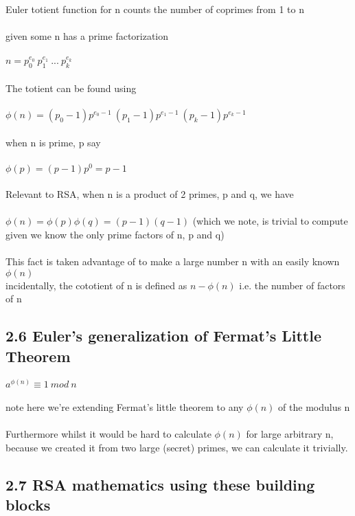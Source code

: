 \documentclass[11pt]{article}   	%
\begin{document}
Euler totient function for n counts the number of coprimes from 1 to n \\
\\
given some n has a prime factorization \\
\\
$ n = p_0^{e_0} \ p_1^{e_1} \ ... \ p_k^{e_k} $ \\
\\
The totient can be found using \\
\\
$ \phi(n) = (p_0 - 1)p^{e_0 - 1} \ (p_1 - 1)p^{e_1 - 1} \ (p_k - 1)p^{e_k - 1} $ \\
\\
when n is prime, p say \\
\\
$ \phi(p) = (p-1)p^0 = p - 1 $ \\
\\
Relevant to RSA, when n is a product of 2 primes, p and q, we have \\
\\
$ \phi(n) = \phi(p)\phi(q) = (p-1)(q-1) $ (which we note, is trivial to compute given we know the only prime factors of n, p and q) \\
\\
This fact is taken advantage of to make a large number n with an easily known $ \phi(n) $
\\
incidentally, the cototient of n is defined as $ n - \phi(n) $ i.e. the number of factors of n \\


\subsection*{2.6 Euler’s generalization of Fermat’s Little Theorem}

$ a^{\phi(n)} \equiv 1 \ mod \ n $ \\
\\
note here we're extending Fermat's little theorem to any $ \phi(n) $ of the modulus n \\
\\
Furthermore whilst it would be hard to calculate $ \phi(n) $ for large arbitrary n, because we created it from two large (secret) primes, we can calculate it trivially.


\subsection*{2.7 RSA mathematics using these building blocks}
\end{document}

